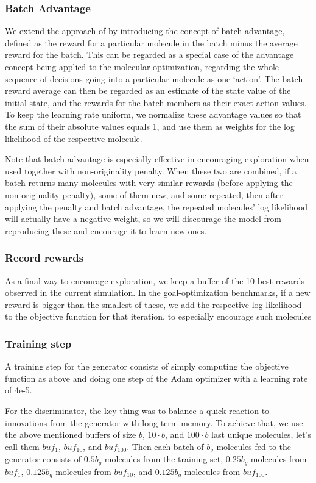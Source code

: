 \documentclass{article}
\begin{document}
\subsubsection{Batch Advantage}
We extend the approach of \cite{segler2017} by introducing the concept of batch advantage, defined as the reward for a particular molecule in the batch minus the average reward for the batch. This can be regarded as a special case of the advantage concept being applied to the molecular optimization, regarding the whole sequence of decisions going into a particular molecule as one `action'. The batch reward average can then be regarded as an estimate of the state value of the initial state, and the rewards for the batch members as their exact action values. To keep the learning rate uniform, we normalize these advantage values so that the sum of their absolute values equals 1, and use them as weights for the log likelihood of the respective molecule.

Note that batch advantage is especially effective in encouraging exploration when used together with non-originality penalty. When these two are combined, if a batch returns many molecules with very similar rewards (before applying the non-originality penalty), some of them new, and some repeated, then after applying the penalty and batch advantage, the repeated molecules' log likelihood will actually have a negative weight, so we will discourage the model from reproducing these and encourage it to learn new ones.
\subsubsection{Record rewards}
As a final way to encourage exploration, we keep a buffer of the 10 best rewards observed in the current simulation. In the goal-optimization benchmarks, if a new reward is bigger than the smallest of these, we add the respective log likelihood to the objective function for that iteration, to especially encourage such molecules
\subsubsection{Training step}
A training step for the generator consists of simply computing the objective function as above and doing one step of the Adam optimizer with a learning rate of 4e-5.

For the discriminator, the key thing was to balance a quick reaction to innovations from the generator with long-term memory. To achieve that, we use the above mentioned buffers of size $b$, $10\cdot b$, and $100\cdot b$ last unique molecules, let's call them $buf_1$, $buf_{10}$, and $buf_{100}$. Then each batch of $b_g$ molecules fed to the generator consists of $0.5 b_g$ molecules from the training set, $0.25 b_g$ molecules from $buf_1$,  $0.125 b_g$ molecules from $buf_{10}$, and  $0.125 b_g$ molecules from $buf_{100}$. 
\end{document}
